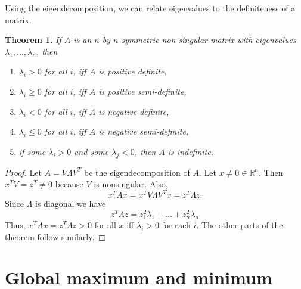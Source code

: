 \documentclass[12pt,reqno]{amsart}
\newtheorem{theorem}{Theorem}[section]
\theoremstyle{definition}
\def\R{\mathbb{R}}
\begin{document}
Using the eigendecomposition, we can relate eigenvalues to the
definiteness of a matrix.
\begin{theorem}
  If $A$ is an $n$ by $n$ symmetric non-singular matrix with
  eigenvalues $\lambda_1, ..., \lambda_n$, then
  \begin{enumerate}
  \item $\lambda_i > 0$ for all $i$, iff $A$ is positive definite,
  \item $\lambda_i \geq 0$ for all $i$, iff $A$ is positive semi-definite,
  \item $\lambda_i < 0$ for all $i$, iff $A$ is negative definite,    
  \item $\lambda_i \leq 0$ for all $i$, iff $A$ is negative
    semi-definite,
  \item if some $\lambda_i > 0$ and some $\lambda_j < 0$, then $A$ is
    indefinite.
  \end{enumerate}
\end{theorem}
\begin{proof}
  Let $A = V \Lambda V^T$ be the eigendecomposition of $A$. Let $x
  \neq 0 \in \R^n$. Then $x^T V = z^T \neq 0$ because $V$ is
  nonsingular. Also, 
  \[ x^T A x = x^T V \Lambda V^T x = z^T \Lambda z. \]
  Since $\Lambda$ is diagonal we have
  \[ z^T \Lambda z = z_1^2 \lambda_1 + ... + z_n^2 \lambda_n \]
  Thus, $x^T A  x= z^T \Lambda z > 0$ for all $x$ iff $\lambda_i>0$
  for each $i$. The other parts of the theorem follow similarly. 
\end{proof}

\section{Global maximum and minimum}
\end{document}

